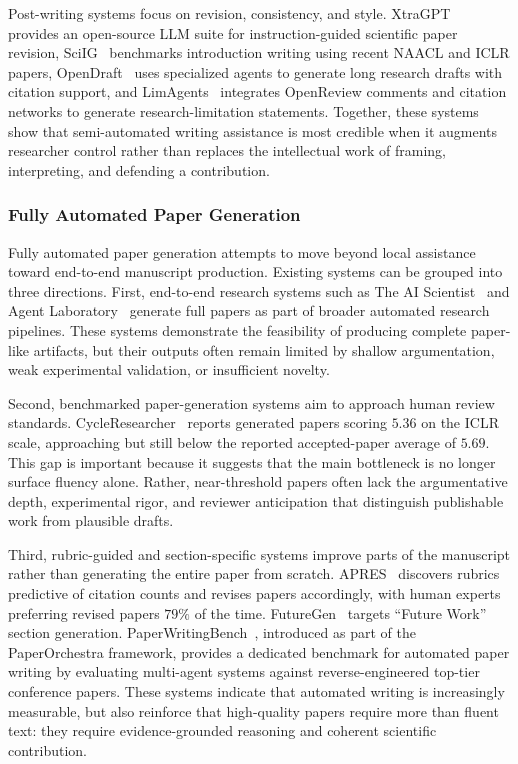 Post-writing systems focus on revision, consistency, and style. XtraGPT~\cite{xtragpt2025} provides an open-source LLM suite for instruction-guided scientific paper revision, SciIG~\cite{sciig2025} benchmarks introduction writing using recent NAACL and ICLR papers, OpenDraft~\cite{opendraft2025} uses specialized agents to generate long research drafts with citation support, and LimAgents~\cite{limagents2026} integrates OpenReview comments and citation networks to generate research-limitation statements. Together, these systems show that semi-automated writing assistance is most credible when it augments researcher control rather than replaces the intellectual work of framing, interpreting, and defending a contribution.



\subsubsection{Fully Automated Paper Generation}
\label{sec:writing_auto}

Fully automated paper generation attempts to move beyond local assistance toward end-to-end manuscript production. Existing systems can be grouped into three directions. First, end-to-end research systems such as The AI Scientist~\cite{lu2024aiscientist,aiscientistnature2026} and Agent Laboratory~\cite{schmidgall2025agentlab} generate full papers as part of broader automated research pipelines. These systems demonstrate the feasibility of producing complete paper-like artifacts, but their outputs often remain limited by shallow argumentation, weak experimental validation, or insufficient novelty.

Second, benchmarked paper-generation systems aim to approach human review standards. CycleResearcher~\cite{cycleresearcher2024} reports generated papers scoring $5.36$ on the ICLR scale, approaching but still below the reported accepted-paper average of $5.69$. This gap is important because it suggests that the main bottleneck is no longer surface fluency alone. Rather, near-threshold papers often lack the argumentative depth, experimental rigor, and reviewer anticipation that distinguish publishable work from plausible drafts.

Third, rubric-guided and section-specific systems improve parts of the manuscript rather than generating the entire paper from scratch. APRES~\cite{apres2026} discovers rubrics predictive of citation counts and revises papers accordingly, with human experts preferring revised papers $79\%$ of the time. FutureGen~\cite{futuregen2025} targets ``Future Work'' section generation. PaperWritingBench~\cite{paperwritingbench2026}, introduced as part of the PaperOrchestra framework, provides a dedicated benchmark for automated paper writing by evaluating multi-agent systems against reverse-engineered top-tier conference papers. These systems indicate that automated writing is increasingly measurable, but also reinforce that high-quality papers require more than fluent text: they require evidence-grounded reasoning and coherent scientific contribution.



